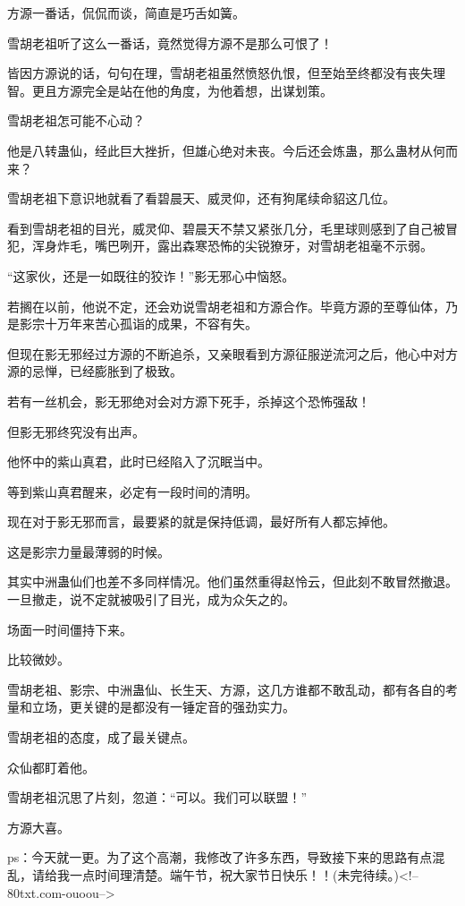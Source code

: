\begin{this_body}
方源一番话，侃侃而谈，简直是巧舌如簧。

雪胡老祖听了这么一番话，竟然觉得方源不是那么可恨了！

皆因方源说的话，句句在理，雪胡老祖虽然愤怒仇恨，但至始至终都没有丧失理智。更且方源完全是站在他的角度，为他着想，出谋划策。

雪胡老祖怎可能不心动？

他是八转蛊仙，经此巨大挫折，但雄心绝对未丧。今后还会炼蛊，那么蛊材从何而来？

雪胡老祖下意识地就看了看碧晨天、威灵仰，还有狗尾续命貂这几位。

看到雪胡老祖的目光，威灵仰、碧晨天不禁又紧张几分，毛里球则感到了自己被冒犯，浑身炸毛，嘴巴咧开，露出森寒恐怖的尖锐獠牙，对雪胡老祖毫不示弱。

“这家伙，还是一如既往的狡诈！”影无邪心中恼怒。

若搁在以前，他说不定，还会劝说雪胡老祖和方源合作。毕竟方源的至尊仙体，乃是影宗十万年来苦心孤诣的成果，不容有失。

但现在影无邪经过方源的不断追杀，又亲眼看到方源征服逆流河之后，他心中对方源的忌惮，已经膨胀到了极致。

若有一丝机会，影无邪绝对会对方源下死手，杀掉这个恐怖强敌！

但影无邪终究没有出声。

他怀中的紫山真君，此时已经陷入了沉眠当中。

等到紫山真君醒来，必定有一段时间的清明。

现在对于影无邪而言，最要紧的就是保持低调，最好所有人都忘掉他。

这是影宗力量最薄弱的时候。

其实中洲蛊仙们也差不多同样情况。他们虽然重得赵怜云，但此刻不敢冒然撤退。一旦撤走，说不定就被吸引了目光，成为众矢之的。

场面一时间僵持下来。

比较微妙。

雪胡老祖、影宗、中洲蛊仙、长生天、方源，这几方谁都不敢乱动，都有各自的考量和立场，更关键的是都没有一锤定音的强劲实力。

雪胡老祖的态度，成了最关键点。

众仙都盯着他。

雪胡老祖沉思了片刻，忽道：“可以。我们可以联盟！”

方源大喜。

ps：今天就一更。为了这个高潮，我修改了许多东西，导致接下来的思路有点混乱，请给我一点时间理清楚。端午节，祝大家节日快乐！！(未完待续。)<!--80txt.com-ouoou-->

\end{this_body}

